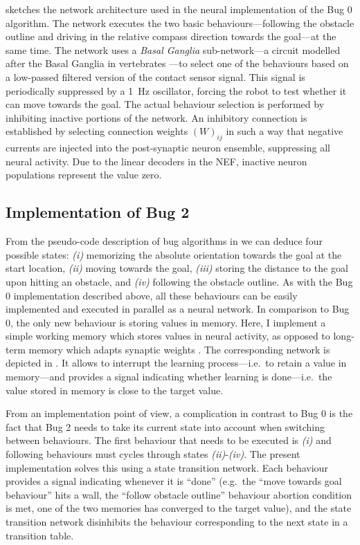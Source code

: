 \documentclass[letterpaper,10pt,conference]{ieeeconf}
\begin{document}
 sketches the network architecture used in the neural implementation of the Bug 0 algorithm. The network executes the two basic behaviours---following the obstacle outline and driving in the relative compass direction towards the goal---at the same time. The network uses a \emph{Basal Ganglia} sub-network---a circuit modelled after the Basal Ganglia in vertebrates \cite{stewart2010a}---to select one of the behaviours based on a low-passed filtered version of the contact sensor signal. This signal is periodically suppressed by a \SI{1}{\hertz} oscillator, forcing the robot to test whether it can move towards the goal. The actual behaviour selection is performed by inhibiting inactive portions of the network. An inhibitory connection is established by selecting connection weights $(W)_{ij}$ in such a way that negative currents are injected into the post-synaptic neuron ensemble, suppressing all neural activity. Due to the linear decoders in the NEF, inactive neuron populations represent the value zero.

\subsection{Implementation of Bug 2}

From the pseudo-code description of bug algorithms in  we can deduce four possible states: \emph{(i)} memorizing the absolute orientation towards the goal at the start location, \emph{(ii)} moving towards the goal, \emph{(iii)} storing the distance to the goal upon hitting an obstacle, and \emph{(iv)} following the obstacle outline. As with the Bug 0 implementation described above, all these behaviours can be easily implemented and executed in parallel as a neural network. In comparison to Bug 0, the only new behaviour is storing values in memory. Here, I implement a simple working memory which stores values in neural activity, as opposed to long-term memory which adapts synaptic weights \cite{eliasmith2013build}. The corresponding network is depicted in . It allows to interrupt the learning process---i.e.~to retain a value in memory---and provides a signal indicating whether learning is done---i.e.~the value stored in memory is close to the target value.

From an implementation point of view, a complication in contrast to Bug 0 is the fact that Bug 2 needs to take its current state into account when switching between behaviours. The first behaviour that needs to be executed is \emph{(i)} and following behaviours must cycles through states \emph{(ii)}-\emph{(iv)}. The present implementation solves this using a state transition network. Each behaviour provides a signal indicating whenever it is \enquote{done} (e.g.~the \enquote{move towards goal behaviour} hits a wall, the \enquote{follow obstacle outline} behaviour abortion condition is met, one of the two memories has converged to the target value), and the state transition network disinhibits the behaviour corresponding to the next state in a transition table.
\end{document}
